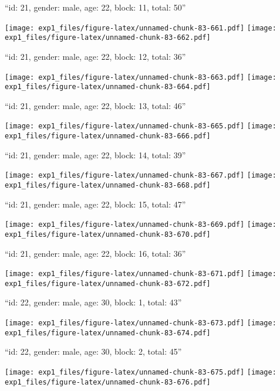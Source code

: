 \documentclass[11pt,,]{article}
\begin{document}
\newpage
[1] 

``id: 21, gender: male, age: 22, block: 11, total: 50''

\texttt{[image: exp1\_files/figure-latex/unnamed-chunk-83-661.pdf]}
\texttt{[image: exp1\_files/figure-latex/unnamed-chunk-83-662.pdf]}

\newpage
[1] 

``id: 21, gender: male, age: 22, block: 12, total: 36''

\texttt{[image: exp1\_files/figure-latex/unnamed-chunk-83-663.pdf]}
\texttt{[image: exp1\_files/figure-latex/unnamed-chunk-83-664.pdf]}

\newpage
[1] 

``id: 21, gender: male, age: 22, block: 13, total: 46''

\texttt{[image: exp1\_files/figure-latex/unnamed-chunk-83-665.pdf]}
\texttt{[image: exp1\_files/figure-latex/unnamed-chunk-83-666.pdf]}

\newpage
[1] 

``id: 21, gender: male, age: 22, block: 14, total: 39''

\texttt{[image: exp1\_files/figure-latex/unnamed-chunk-83-667.pdf]}
\texttt{[image: exp1\_files/figure-latex/unnamed-chunk-83-668.pdf]}

\newpage
[1] 

``id: 21, gender: male, age: 22, block: 15, total: 47''

\texttt{[image: exp1\_files/figure-latex/unnamed-chunk-83-669.pdf]}
\texttt{[image: exp1\_files/figure-latex/unnamed-chunk-83-670.pdf]}

\newpage
[1] 

``id: 21, gender: male, age: 22, block: 16, total: 36''

\texttt{[image: exp1\_files/figure-latex/unnamed-chunk-83-671.pdf]}
\texttt{[image: exp1\_files/figure-latex/unnamed-chunk-83-672.pdf]}

\newpage
[1] 

``id: 22, gender: male, age: 30, block: 1, total: 43''

\texttt{[image: exp1\_files/figure-latex/unnamed-chunk-83-673.pdf]}
\texttt{[image: exp1\_files/figure-latex/unnamed-chunk-83-674.pdf]}

\newpage
[1] 

``id: 22, gender: male, age: 30, block: 2, total: 45''

\texttt{[image: exp1\_files/figure-latex/unnamed-chunk-83-675.pdf]}
\texttt{[image: exp1\_files/figure-latex/unnamed-chunk-83-676.pdf]}
\end{document}
